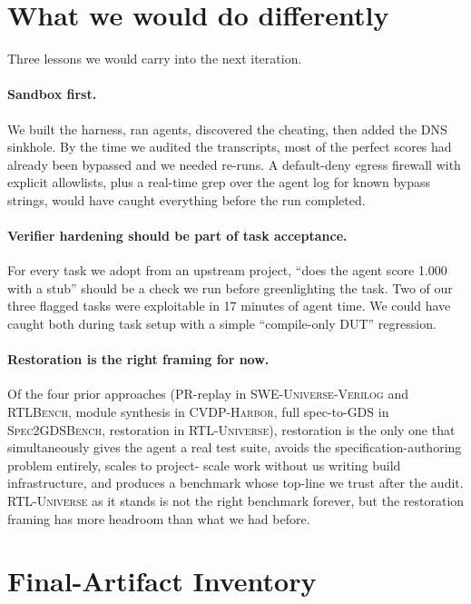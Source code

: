 \documentclass{article}
\begin{document}
\section{What we would do differently}

Three lessons we would carry into the next iteration.

\paragraph{Sandbox first.} We built the harness, ran agents, discovered the cheating, then
added the DNS sinkhole. By the time we audited the transcripts, most of the perfect scores
had already been bypassed and we needed re-runs. A default-deny egress firewall with
explicit allowlists, plus a real-time grep over the agent log for known bypass strings,
would have caught everything before the run completed.

\paragraph{Verifier hardening should be part of task acceptance.} For every task we adopt
from an upstream project, ``does the agent score 1.000 with a stub'' should be a check we
run before greenlighting the task. Two of our three flagged tasks were exploitable in 17
minutes of agent time. We could have caught both during task setup with a simple
``compile-only DUT'' regression.

\paragraph{Restoration is the right framing for now.} Of the four prior approaches
(PR-replay in \textsc{SWE-Universe-Verilog} and \textsc{RTLBench}, module synthesis in
\textsc{CVDP-Harbor}, full spec-to-GDS in \textsc{Spec2GDSBench}, restoration in
\textsc{RTL-Universe}), restoration is the only one that simultaneously gives the agent a
real test suite, avoids the specification-authoring problem entirely, scales to project-
scale work without us writing build infrastructure, and produces a benchmark whose
top-line we trust after the audit. \textsc{RTL-Universe} as it stands is not the right
benchmark forever, but the restoration framing has more headroom than what we had before.

\section{Final-Artifact Inventory}
\end{document}
